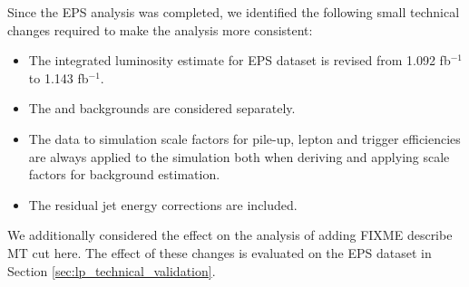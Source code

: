 
Since the EPS analysis was completed, we identified the following small technical
changes required to make the analysis more consistent:

\begin{itemize}
    \item The integrated luminosity estimate for EPS dataset is revised from 1.092 fb$^{-1}$ to 1.143 fb$^{-1}$.
    \item The \dytt and \dyll backgrounds are considered separately.
    \item The data to simulation scale factors for pile-up, lepton and trigger efficiencies are 
always applied to the simulation both when deriving and applying scale factors for background estimation.
    \item The residual jet energy corrections are included.
\end{itemize}

We additionally considered the effect on the analysis of adding FIXME describe MT cut here.
The effect of these changes is evaluated on the EPS dataset in Section \ref{sec:lp_technical_validation}.

